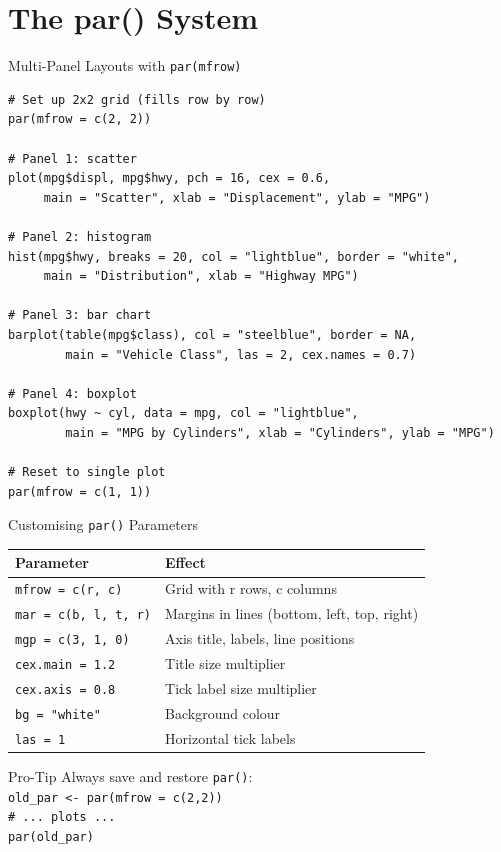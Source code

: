 \documentclass[10pt]{beamer}
\begin{document}
\section{The par() System}

\begin{frame}[fragile]{Multi-Panel Layouts with \texttt{par(mfrow)}}
\begin{lstlisting}[style=rstyle]
# Set up 2x2 grid (fills row by row)
par(mfrow = c(2, 2))

# Panel 1: scatter
plot(mpg$displ, mpg$hwy, pch = 16, cex = 0.6,
     main = "Scatter", xlab = "Displacement", ylab = "MPG")

# Panel 2: histogram
hist(mpg$hwy, breaks = 20, col = "lightblue", border = "white",
     main = "Distribution", xlab = "Highway MPG")

# Panel 3: bar chart
barplot(table(mpg$class), col = "steelblue", border = NA,
        main = "Vehicle Class", las = 2, cex.names = 0.7)

# Panel 4: boxplot
boxplot(hwy ~ cyl, data = mpg, col = "lightblue",
        main = "MPG by Cylinders", xlab = "Cylinders", ylab = "MPG")

# Reset to single plot
par(mfrow = c(1, 1))
\end{lstlisting}
\end{frame}

\begin{frame}[fragile]{Customising \texttt{par()} Parameters}
  \centering
  \begin{tabular}{lp{5.5cm}}
    \toprule
    \textbf{Parameter} & \textbf{Effect} \\
    \midrule
    \texttt{mfrow = c(r, c)} & Grid with r rows, c columns \\
    \texttt{mar = c(b, l, t, r)} & Margins in lines (bottom, left, top, right) \\
    \texttt{mgp = c(3, 1, 0)} & Axis title, labels, line positions \\
    \texttt{cex.main = 1.2} & Title size multiplier \\
    \texttt{cex.axis = 0.8} & Tick label size multiplier \\
    \texttt{bg = "white"} & Background colour \\
    \texttt{las = 1} & Horizontal tick labels \\
    \bottomrule
  \end{tabular}

  \vspace{6pt}
  \begin{alertblock}{Pro-Tip}
    Always save and restore \texttt{par()}: \\
    \texttt{old\_par <- par(mfrow = c(2,2))} \\
    \texttt{\# ... plots ...} \\
    \texttt{par(old\_par)}
  \end{alertblock}
\end{frame}
\end{document}
